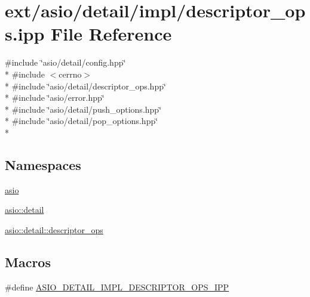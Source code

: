 \hypertarget{descriptor__ops_8ipp}{}\section{ext/asio/detail/impl/descriptor\+\_\+ops.ipp File Reference}
\label{descriptor__ops_8ipp}
{\ttfamily \#include \char`\"{}asio/detail/config.\+hpp\char`\"{}}\\*
{\ttfamily \#include $<$cerrno$>$}\\*
{\ttfamily \#include \char`\"{}asio/detail/descriptor\+\_\+ops.\+hpp\char`\"{}}\\*
{\ttfamily \#include \char`\"{}asio/error.\+hpp\char`\"{}}\\*
{\ttfamily \#include \char`\"{}asio/detail/push\+\_\+options.\+hpp\char`\"{}}\\*
{\ttfamily \#include \char`\"{}asio/detail/pop\+\_\+options.\+hpp\char`\"{}}\\*
\subsection*{Namespaces}
\begin{DoxyCompactItemize}
\item 
 \hyperlink{namespaceasio}{asio}
\item 
 \hyperlink{namespaceasio_1_1detail}{asio\+::detail}
\item 
 \hyperlink{namespaceasio_1_1detail_1_1descriptor__ops}{asio\+::detail\+::descriptor\+\_\+ops}
\end{DoxyCompactItemize}
\subsection*{Macros}
\begin{DoxyCompactItemize}
\item 
\#define \hyperlink{descriptor__ops_8ipp_ab676e939c59e7bba7d1a26d9f135430c}{A\+S\+I\+O\+\_\+\+D\+E\+T\+A\+I\+L\+\_\+\+I\+M\+P\+L\+\_\+\+D\+E\+S\+C\+R\+I\+P\+T\+O\+R\+\_\+\+O\+P\+S\+\_\+\+I\+P\+P}
\end{DoxyCompactItemize}
